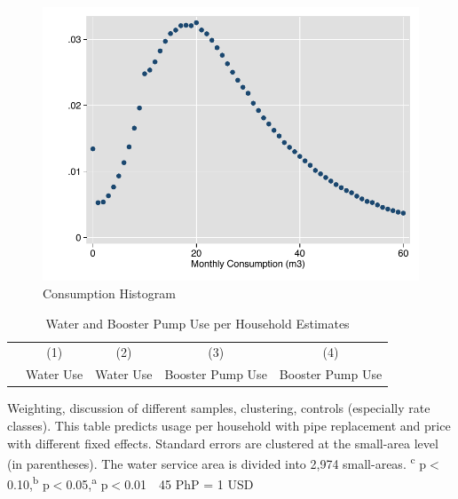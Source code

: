 \documentclass[12pt,table]{article}
\newcommand{\regtext}{
Standard errors are clustered at the small-area level (in parentheses).  The water service area is divided into 2,974 small-areas.
\textsuperscript{c} p$<$0.10,\textsuperscript{b} p$<$0.05,\textsuperscript{a} p$<$0.01 \,\,
}
\begin{document}
\begin{figure}
\begin{center}
\caption{Consumption Histogram}
\includegraphics[scale=1]{tables/consumption_histogram.pdf}
\end{center}
\end{figure}



\begin{table}[h!] 
\centering
\caption{Water and Booster Pump Use per Household Estimates}\label{table:mainregshet}
\vspace{-2mm}
\begin{threeparttable}
\begin{tabular}{@{}l*{1}{CCCC}@{}}
\toprule
  & (1)       & (2)  & (3) & (4)            \\
  & Water Use & Water Use  & Booster Pump Use & Booster Pump Use \\
\midrule

\bottomrule
\end{tabular}
\begin{tablenotes}
\footnotesize
\item Weighting, discussion of different samples, clustering, controls (especially rate classes).  This table predicts usage per household with pipe replacement and price with different fixed effects.   \regtext 45 PhP = 1 USD \,\,
\end{tablenotes}
\end{threeparttable}
\end{table}



{
\small
\nocite{*}


}
\end{document}
